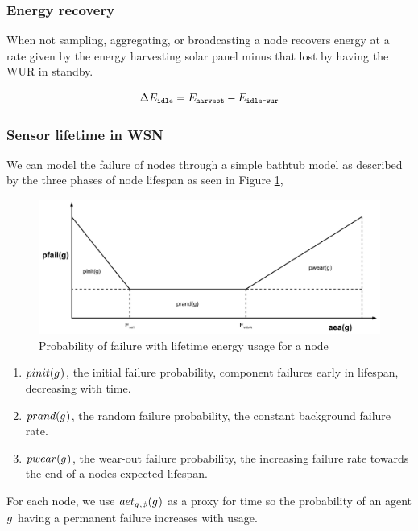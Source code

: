 \subsubsection{Energy recovery}

\newcommand{\setEnergyDeltaIdle}[2]{\Delta\setSymbol{E}{\texttt{idle}}{#2}}
\newcommand{\setEnergyHarvest}[2]{\setSymbol{E}{\texttt{harvest}}{#2}}
\newcommand{\setEnergyWUR}[2]{\setSymbol{E}{\texttt{idle-wur}}{#2}}

When not sampling, aggregating, or broadcasting a node recovers energy at a rate given by the energy harvesting solar panel minus that lost by having the WUR in standby.

\begin{equation}
	\setEnergyDeltaIdle{}{}
	= 
	\setEnergyHarvest{}{}
	-
	\setEnergyWUR{}{}
\end{equation}

\subsubsection{Sensor lifetime in WSN}
We can model the failure of nodes through a simple bathtub model as described by the three phases of node lifespan as seen in Figure \ref{fig:node_reliability_lifespan},
\begin{figure}
	\centering
	\includegraphics[width=0.7\linewidth]{node_reliability_lifespan}
	\caption[Probability of failure with lifetime energy usage for a node]{Probability of failure with lifetime energy usage for a node}
	\label{fig:node_reliability_lifespan}
\end{figure}
\begin{enumerate}
	\item $\functionProbabilityInit{}{}$, the initial failure probability, component failures early in lifespan, decreasing with time.
	\item $\functionProbabilityRand{}{}$, the random failure probability, the constant background failure rate.
	\item $\functionProbabilityWear{}{}$, the wear-out failure probability, the increasing failure rate towards the end of a nodes expected lifespan.
\end{enumerate}
For each node, we use $\functionAgentEnergyTotal{}{}$ as a proxy for time so the probability of an agent $g_{}^{}$ having a permanent failure increases with usage.

